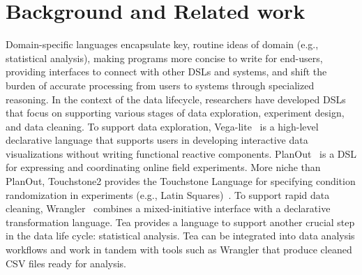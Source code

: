 \section{Background and Related work}
Domain-specific languages encapsulate key, routine ideas of domain (e.g.,
statistical analysis), making programs more concise to write for end-users,
providing interfaces to connect with other DSLs and systems, and shift the
burden of accurate processing from users to systems through specialized
reasoning. In the context of the data lifecycle, researchers have developed DSLs
that focus on supporting various stages of data exploration, experiment design,
and data cleaning. To support data exploration,
Vega-lite~\cite{satyanarayan2017vega} is a high-level declarative language that
supports users in developing interactive data visualizations without writing
functional reactive components. PlanOut~\cite{bakshy2014planout} is a DSL for
expressing and coordinating online field experiments. More niche than PlanOut,
Touchstone2 provides the Touchstone Language for specifying condition
randomization in experiments (e.g., Latin
Squares)~\cite{eiselmayer2019touchstone2}.%
To support rapid data cleaning,  Wrangler~\cite{kandel2011wrangler} combines a
mixed-initiative interface with a declarative transformation language. Tea
provides a language to support another crucial step in the data life cycle:
statistical analysis. Tea can be integrated into data analysis workflows and
work in tandem with tools such as Wrangler that produce cleaned CSV files ready
for analysis.


